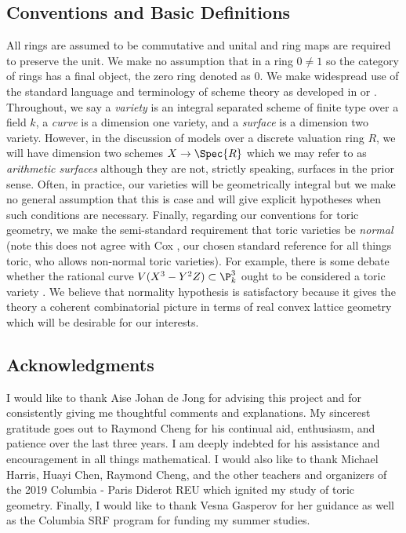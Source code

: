 \documentclass[12pt]{article}
\begin{document}
\subsection{Conventions and Basic Definitions}

All rings are assumed to be commutative and unital and ring maps are required to preserve the unit. We make no assumption that in a ring $0 \neq 1$ so the category of rings has a final object, the zero ring denoted as $0$. We make widespread use of the standard language and terminology of scheme theory as developed in \cite{har} or \cite{EGA}. Throughout, we say a \textit{variety} is an integral separated scheme of finite type over a field $k$, a \textit{curve} is a dimension one variety, and a \textit{surface} is a dimension two variety. However, in the discussion of models over a discrete valuation ring $R$, we will have dimension two schemes $X \to \Spec{R}$ which we may refer to as \textit{arithmetic surfaces} although they are not, strictly speaking, surfaces in the prior sense. Often, in practice, our varieties will be geometrically integral but we make no general assumption that this is case and will give explicit hypotheses when such conditions are necessary. Finally, regarding our conventions for toric geometry, we make the semi-standard requirement that toric varieties be \textit{normal} (note this does not agree with Cox \cite{cox, cox_lectures}, our chosen standard reference for all things toric, who allows non-normal toric varieties). For example, there is some debate whether the rational curve $V(X^3 - Y^2 Z) \subset \P^3_k$ ought to be considered a toric variety \cite[Lec. 1, Ex. 1.4]{cox_lectures}. We believe that normality hypothesis is satisfactory because it gives the theory a coherent combinatorial picture in terms of real convex lattice geometry which will be desirable for our interests.

\subsection{Acknowledgments}

I would like to thank Aise Johan de Jong for advising this project and for consistently giving me thoughtful comments and explanations. My sincerest gratitude goes out to Raymond Cheng for his continual aid, enthusiasm, and patience over the last three years. I am deeply indebted for his assistance and encouragement in all things mathematical. I would also like to thank Michael Harris, Huayi Chen, Raymond Cheng, and the other teachers and organizers of the 2019 Columbia - Paris Diderot REU which ignited my study of toric geometry. Finally, I would like to thank Vesna Gasperov for her guidance as well as the Columbia SRF program for funding my summer studies. 

\tableofcontents
\newpage












\end{document}
